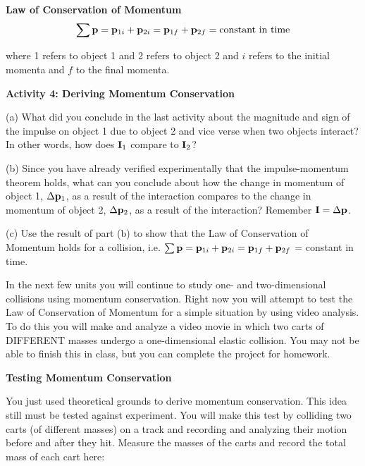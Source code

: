 {\par\centering \textbf{Law of Conservation of Momentum}
\[
\sum {\bf p}={{\bf p}_{1i}}+{{\bf p}_{2i}}={{\bf p}_{1f}}+{{\bf p}_{2f}}=
\mbox{constant in time}\]
\par}

where 1 refers to object 1 and 2 refers to object 2 and $i$ refers to the initial
momenta and $f$ to the final momenta.

\textbf{Activity 4: Deriving Momentum Conservation }

(a) What did you conclude in the last activity about the magnitude and sign
of the impulse on object 1 due to object 2 and vice verse when two objects interact?
In other words, how does \( {{\bf I}_{1}} \) compare to \( {{\bf I}_{2}} \)? 
\vspace{10mm}

(b) Since you have already verified experimentally that the impulse-momentum
theorem holds, what can you conclude about how the change in momentum of object
1, \( \Delta {{\bf p}_{1}} \), as a result of the interaction compares
to the change in momentum of object 2, \( \Delta {{\bf p}_{2}} \),
as a result of the interaction? Remember \( {\bf I}=\Delta {\bf p} \).
\vspace{25mm}

(c) Use the result of part (b) to show that the Law of Conservation
of Momentum holds for a collision, i.e. \( \sum {\bf p} 
=  {{\bf p}_{1i}}  + {{\bf p}_{2i}}  = {{\bf p}_{1f}} 
+ {{\bf p}_{2f}} \) = constant in time.
\vspace{20mm}

In the next few units you will continue to study one- and two-dimensional collisions
using momentum conservation. Right now you will attempt to test the Law of Conservation
of Momentum for a simple situation by using video analysis. To do this you will
make and analyze a video movie in which two carts of DIFFERENT masses undergo
a one-dimensional elastic collision. You may not be able to finish this in class,
but you can complete the project for homework.

\textbf{Testing Momentum Conservation }

You just used theoretical grounds to derive momentum conservation. This idea
still must be tested against experiment. You will make this test by colliding
two carts (of different masses) on a track and recording and analyzing their motion 
before and after they hit. Measure the masses of the carts and record the total mass 
of each cart here:

